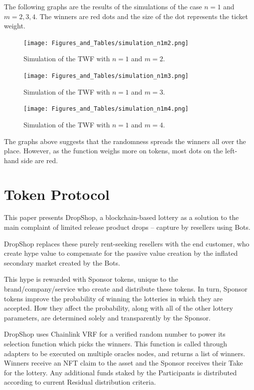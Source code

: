 \documentclass[runningheads]{llncs}
\begin{document}
The following graphs are the results of the simulations of the case $n=1$ and $m=2,3,4$. The winners are red dots and the size of the dot represents the ticket weight.
\begin{figure}[H]
\centering
\texttt{[image: Figures\_and\_Tables/simulation\_n1m2.png]}
\caption{Simulation of the TWF with $n=1$ and $m=2$. }
\label{fig:Lorenz}
\end{figure}
\begin{figure}[H]
\centering
\texttt{[image: Figures\_and\_Tables/simulation\_n1m3.png]}
\caption{Simulation of the TWF with $n=1$ and $m=3$. }
\label{fig:Lorenz}
\end{figure}
\begin{figure}[H]
\centering
\texttt{[image: Figures\_and\_Tables/simulation\_n1m4.png]}
\caption{Simulation of the TWF with $n=1$ and $m=4$. }
\label{fig:Lorenz}
\end{figure}

The graphs above suggests that the randomness spreads the winners all over the place. However, as the function weighs more on tokens, most dots on the left-hand side are red.






\section{Token Protocol}\label{APP-TokenProtocol}
This paper presents DropShop, a blockchain-based lottery as a solution to the main complaint of limited release product drops – capture by resellers using Bots.

DropShop replaces these purely rent-seeking resellers with the end customer, who create hype value to compensate for the passive value creation by the inflated secondary market created by the Bots.

This hype is rewarded with Sponsor tokens, unique to the brand/company/service who create and distribute these tokens.  In turn, Sponsor tokens improve the probability of winning the lotteries in which they are accepted.  How they affect the probability, along with all of the other lottery parameters, are determined solely and transparently by the Sponsor.

DropShop uses Chainlink VRF for a verified random number to power its selection function which picks the winners.  This function is called through adapters to be executed on multiple oracles nodes, and returns a list of winners.  Winners receive an NFT claim to the asset and the Sponsor receives their Take for the lottery.  Any additional funds staked by the Participants is distributed according to current Residual distribution criteria.
\end{document}
